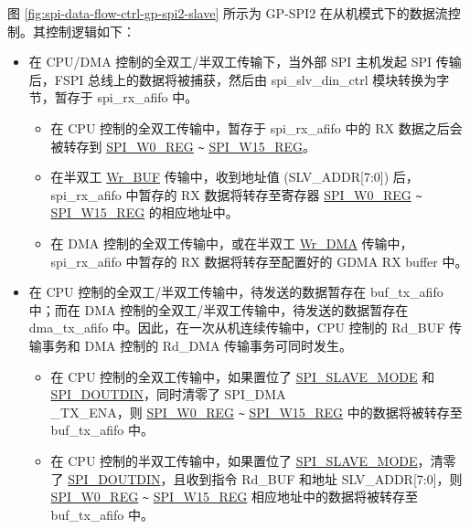 \documentclass[main\_\_CN.tex]{subfiles}
\begin{document}
图 \ref{fig:spi-data-flow-ctrl-gp-spi2-slave} 所示为 GP-SPI2 在从机模式下的数据流控制。其控制逻辑如下：
\begin{itemize}
    \item 在 CPU/DMA 控制的全双工/半双工传输下，当外部 SPI 主机发起 SPI 传输后，FSPI 总线上的数据将被捕获，然后由 spi\_slv\_din\_ctrl 模块转换为字节，暂存于 spi\_rx\_afifo 中。
    \begin{itemize}
        \item 在 CPU 控制的全双工传输中，暂存于 spi\_rx\_afifo 中的 RX 数据之后会被转存到 \hyperref[regdesc:SPIW0REG]{SPI\_W0\_REG} \verb+~+ \hyperref[regdesc:SPIW15REG]{SPI\_W15\_REG}。

        \item 在半双工 \hyperref[other:spi-item-wrbuf]{Wr\_BUF} 传输中，收到地址值 (SLV\_ADDR[7:0]) 后，spi\_rx\_afifo 中暂存的 RX 数据将转存至寄存器 \hyperref[regdesc:SPIW0REG]{SPI\_W0\_REG} \verb+~+ \hyperref[regdesc:SPIW15REG]{SPI\_W15\_REG} 的相应地址中。


        \item 在 DMA 控制的全双工传输中，或在半双工 \hyperref[other:spi-item-wrdma]{Wr\_DMA} 传输中，spi\_rx\_afifo 中暂存的 RX 数据将转存至配置好的 GDMA RX buffer 中。

    \end{itemize}

    \item 在 CPU 控制的全双工/半双工传输中，待发送的数据暂存在 buf\_tx\_afifo 中；而在 DMA 控制的全双工/半双工传输中，待发送的数据暂存在 dma\_tx\_afifo 中。因此，在一次从机连续传输中，CPU 控制的 Rd\_BUF 传输事务和 DMA 控制的 Rd\_DMA 传输事务可同时发生。
    \begin{itemize}
        \item 在 CPU 控制的全双工传输中，如果置位了 \hyperref[fielddesc:SPISLAVEMODE]{SPI\_SLAVE\_MODE} 和 \hyperref[fielddesc:SPIDOUTDIN]{SPI\_DOUTDIN}，同时清零了 SPI\_DMA\\\_TX\_ENA，则 \hyperref[regdesc:SPIW0REG]{SPI\_W0\_REG} \verb+~+ \hyperref[regdesc:SPIW15REG]{SPI\_W15\_REG} 中的数据将被转存至 buf\_tx\_afifo 中。

        \item 在 CPU 控制的半双工传输中，如果置位了 \hyperref[fielddesc:SPISLAVEMODE]{SPI\_SLAVE\_MODE}，清零了 \hyperref[fielddesc:SPIDOUTDIN]{SPI\_DOUTDIN}，且收到指令 Rd\_BUF 和地址 SLV\_ADDR[7:0]，则 \hyperref[regdesc:SPIW0REG]{SPI\_W0\_REG} \verb+~+ \hyperref[regdesc:SPIW15REG]{SPI\_W15\_REG} 相应地址中的数据将被转存至 buf\_tx\_afifo 中。


\end{itemize}
\end{itemize}
\end{document}

